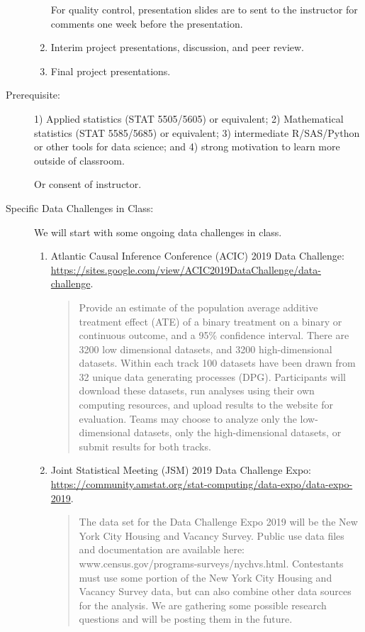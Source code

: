\documentclass[twocolumn, 11pt]{article}
\begin{document}
\begin{description}
\begin{enumerate}

  For quality control, presentation slides are to sent to the instructor for comments one week before the presentation.

\item Interim project presentations, discussion, and peer review.

\item Final project presentations.

\end{enumerate}

\item[Prerequisite:]
1) Applied statistics (STAT 5505/5605) or equivalent;
2) Mathematical statistics (STAT 5585/5685) or equivalent;
3) intermediate R/SAS/Python or other tools for data science;
and 4) strong motivation to learn more outside of classroom.

Or consent of instructor.

\item[Specific Data Challenges in Class:] \hspace{0pt}
  We will start with some ongoing data challenges in class.
  \begin{enumerate}
  \item
    Atlantic Causal Inference Conference (ACIC) 2019 Data Challenge:
    \url{https://sites.google.com/view/ACIC2019DataChallenge/data-challenge}.
    \begin{quote}
      Provide an estimate of the population average additive treatment effect (ATE) of a binary treatment on a binary or continuous outcome, and a 95\% confidence interval.  There are 3200 low dimensional datasets, and 3200 high-dimensional datasets. Within each track 100 datasets have been drawn from 32 unique data generating processes (DPG).   Participants will download these datasets, run analyses using their own computing resources, and upload results to the website for evaluation. Teams may choose to analyze only the low-dimensional  datasets, only the high-dimensional datasets, or submit results for both tracks.
    \end{quote}
    
  \item
    Joint Statistical Meeting (JSM) 2019 Data Challenge Expo:
    \url{https://community.amstat.org/stat-computing/data-expo/data-expo-2019}.
    \begin{quote}
      The data set for the Data Challenge Expo 2019 will be the New York City Housing and Vacancy Survey. Public use data files and documentation are available here:  www.census.gov/programs-surveys/nychvs.html.  Contestants must use some portion of the New York City Housing and Vacancy Survey data, but can also combine other data sources for the analysis. We are gathering some possible research questions and will be posting them in the future.
    \end{quote}


\end{enumerate}
\end{description}
\end{document}

